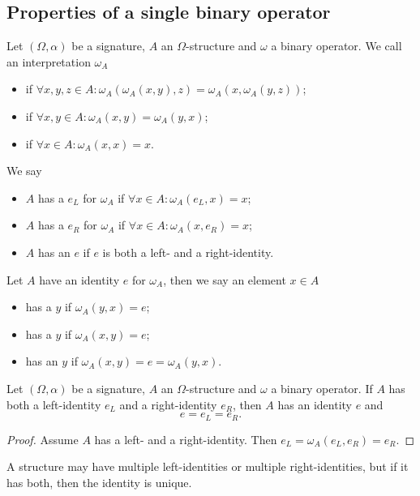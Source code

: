 \subsection{Properties of a single binary operator}
\begin{definition}
Let $(\Omega, \alpha)$ be a signature, $A$ an $\Omega$-structure and $\omega$ a binary operator. We call an interpretation $\omega_A$
\begin{itemize}
\item {} if $\forall x,y,z\in A: \omega_A(\omega_A(x,y),z) = \omega_A(x,\omega_A(y,z))$;
\item {} if $\forall x,y\in A: \omega_A(x,y) = \omega_A(y,x)$;
\item {} if $\forall x\in A: \omega_A(x,x) = x$.
\end{itemize}
We say
\begin{itemize}
\item $A$ has a  $e_L$ for $\omega_A$ if $\forall x\in A: \omega_A(e_L, x) = x$;
\item $A$ has a  $e_R$ for $\omega_A$ if $\forall x\in A: \omega_A(x, e_R) = x$;
\item $A$ has an  $e$ if $e$ is both a left- and a right-identity.
\end{itemize}
Let $A$ have an identity $e$ for $\omega_A$, then we say an element $x\in A$
\begin{itemize}
\item has a  $y$ if $\omega_A(y,x) = e$;
\item has a  $y$ if $\omega_A(x,y) = e$;
\item has an  $y$ if $\omega_A(x,y) = e = \omega_A(y,x)$.
\end{itemize}
\end{definition}

\begin{lemma}
Let $(\Omega, \alpha)$ be a signature, $A$ an $\Omega$-structure and $\omega$ a binary operator. If $A$ has both a left-identity $e_L$ and a right-identity $e_R$, then $A$ has an identity $e$ and
\[ e= e_L = e_R. \]
\end{lemma}
\begin{proof}
Assume $A$ has a left- and a right-identity. Then $e_L = \omega_A(e_L, e_R) = e_R$.
\end{proof}
\begin{corollary}
A structure may have multiple left-identities or multiple right-identities, but if it has both, then the identity is unique.
\end{corollary}

